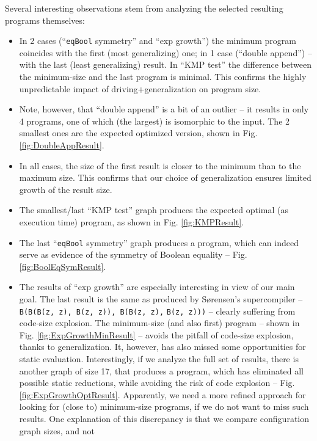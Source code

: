 \documentclass[submission,copyright,creativecommons]{eptcs}
\begin{document}
Several interesting observations stem from analyzing the selected resulting programs themselves:
\begin{itemize}
  \item In 2 cases (``\verb|eqBool| symmetry'' and ``exp growth'') the minimum program coincides with the first (most generalizing) one;
    in 1 case (``double append'') -- with the last (least generalizing) result. 
    In ``KMP test'' the difference between the minimum-size and the last program is minimal.
    This confirms the highly unpredictable impact of driving+generalization on program size.
  \item Note, however, that ``double append'' is a bit of an outlier -- it results in only 4 programs,
    one of which (the largest) is isomorphic to the input. The 2 smallest ones are the expected
    optimized version, shown in Fig. \ref{fig:DoubleAppResult}.
  \item In all cases, the size of the first result is closer to the minimum than to the maximum size.
    This confirms that our choice of generalization ensures limited growth of the result size.
  \item The smallest/last ``KMP test'' graph produces the expected optimal (as execution time) program,
    as shown in Fig. \ref{fig:KMPResult}.
  \item The last ``\verb|eqBool| symmetry'' graph produces a program, which can indeed serve as evidence of the
    symmetry of Boolean equality -- Fig. \ref{fig:BoolEqSymResult}.
  \item The results of ``exp growth'' are especially interesting in view of our main goal.
    The last result is the same as produced by S{\o}rensen's supercompiler --
    \verb|B(B(B(z, z), B(z, z)), B(B(z, z),| \verb|B(z, z)))| -- clearly suffering from code-size explosion.
    The minimum-size (and also first) program -- shown in Fig. \ref{fig:ExpGrowthMinResult} --
    avoids the pitfall of code-size explosion, thanks to generalization.
    It, however, has also missed some opportunities for static evaluation.
    Interestingly, if we analyze the full set of results, there is another
    graph of size 17, that produces a program, which has eliminated all possible static reductions,
    while avoiding the risk of code explosion -- Fig. \ref{fig:ExpGrowthOptResult}.
    Apparently, we need a more refined approach for looking for (close to) minimum-size programs, 
    if we do not want to miss such results.
    One explanation of this discrepancy is that we compare configuration graph sizes, and not

\end{itemize}
\end{document}
